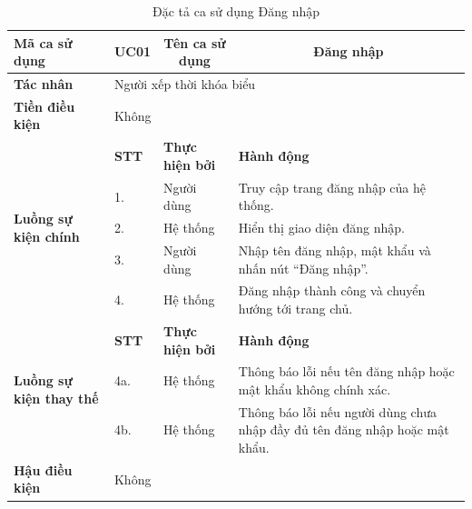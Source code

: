 \documentclass[../DoAn.tex]{subfiles}
\begin{document}
\begin{longtable}{|p{2.8cm}|p{1cm}|p{2.8cm}|p{6.3cm}|}
\caption{Đặc tả ca sử dụng Đăng nhập}
\label{tab:uc_dang_nhap} \\
\hline
\multicolumn{1}{|l|}{\textbf{Mã ca sử dụng}} &
\multicolumn{1}{c|}{UC01} &
\multicolumn{1}{c|}{\textbf{Tên ca sử dụng}} &
\multicolumn{1}{c|}{Đăng nhập} \\
\hline
\multicolumn{1}{|l|}{\textbf{Tác nhân}} &
\multicolumn{3}{l|}{Người xếp thời khóa biểu} \\
\hline
\multicolumn{1}{|l|}{\textbf{Tiền điều kiện}} &
\multicolumn{3}{l|}{Không} \\
\hline
\multirow{5}{2.8cm}{\textbf{Luồng sự kiện chính}} & \textbf{STT} & \textbf{Thực hiện bởi} & \textbf{Hành động} \\
\cline{2-4}
& 1. & Người dùng & Truy cập trang đăng nhập của hệ thống. \\
\cline{2-4}
& 2. & Hệ thống & Hiển thị giao diện đăng nhập. \\
\cline{2-4}
& 3. & Người dùng & Nhập tên đăng nhập, mật khẩu và nhấn nút ``Đăng nhập''. \\
\cline{2-4}
& 4. & Hệ thống & Đăng nhập thành công và chuyển hướng tới trang chủ. \\
\hline
\multirow{3}{2.8cm}{\textbf{Luồng sự kiện thay thế}} & \textbf{STT} & \textbf{Thực hiện bởi} & \textbf{Hành động} \\
\cline{2-4}
& 4a. & Hệ thống & Thông báo lỗi nếu tên đăng nhập hoặc mật khẩu không chính xác. \\
\cline{2-4}
& 4b. & Hệ thống & Thông báo lỗi nếu người dùng chưa nhập đầy đủ tên đăng nhập hoặc mật khẩu. \\
\hline
\multicolumn{1}{|l|}{\textbf{Hậu điều kiện}} &
\multicolumn{3}{l|}{Không} \\
\hline
\end{longtable}
\end{document}
